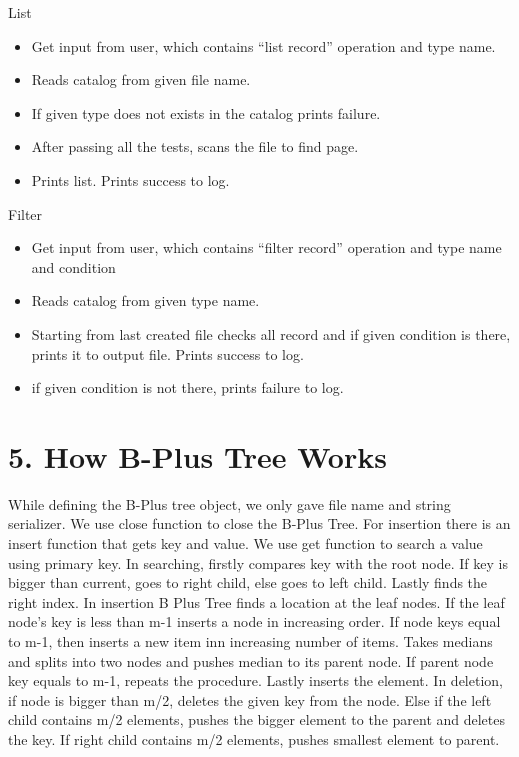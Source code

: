 \documentclass[
]{article}
\begin{document}
List

\begin{itemize}
\item
  Get input from user, which contains ``list record'' operation and type
  name.
\item
  Reads catalog from given file name.
\item
  If given type does not exists in the catalog prints failure.
\item
  After passing all the tests, scans the file to find page.
\item
  Prints list. Prints success to log.

\end{itemize}

Filter

\begin{itemize}
\item
  Get input from user, which contains ``filter record'' operation and
  type name and condition
\item
  Reads catalog from given type name.
\item
  Starting from last created file checks all record and if given condition is there, prints it to output file. Prints success to log.
\item
  if given condition is not there, prints failure to log.
\end{itemize}

\hypertarget{how-b-plus-tree-works}{%
\section{5. How B-Plus Tree Works}\label{how-b-plus-tree-works}}

While defining the B-Plus tree object, we only gave file name and string
serializer. We use close function to close the B-Plus Tree. For
insertion there is an insert function that gets key and value. We use
get function to search a value using primary key. In searching, firstly
compares key with the root node. If key is bigger than current, goes to
right child, else goes to left child. Lastly finds the right index. In
insertion B Plus Tree finds a location at the leaf nodes. If the leaf
node's key is less than m-1 inserts a node in increasing order. If node
keys equal to m-1, then inserts a new item inn increasing number of
items. Takes medians and splits into two nodes and pushes median to its
parent node. If parent node key equals to m-1, repeats the procedure.
Lastly inserts the element. In deletion, if node is bigger than m/2,
deletes the given key from the node. Else if the left child contains m/2
elements, pushes the bigger element to the parent and deletes the key.
If right child contains m/2 elements, pushes smallest element to parent.
\end{document}
